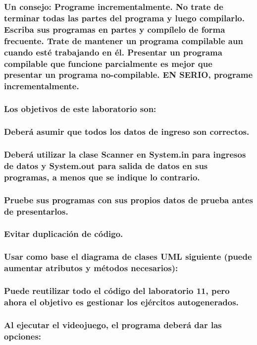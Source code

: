 \documentclass{article}
\begin{document}
\begin{itemize}
\begin{itemize}
        \subsubsection {Un consejo: Programe incrementalmente. No trate de terminar todas las partes del programa y luego compilarlo. Escriba sus programas en partes y compílelo de forma frecuente. Trate de mantener un programa compilable aun cuando esté trabajando en él. Presentar un programa compilable que funcione parcialmente es mejor que presentar un programa no-compilable.  EN SERIO, programe incrementalmente.}
        \subsubsection {Los objetivos de este laboratorio son:}
        \subsubsection {Deberá asumir que todos los datos de ingreso son correctos.}
        \subsubsection {Deberá utilizar la clase Scanner en System.in para ingresos de datos y System.out para salida de datos en sus programas, a menos que se indique lo contrario.}
        \subsubsection {Pruebe sus programas con sus propios datos de prueba antes de presentarlos.} 
        \subsubsection {Evitar duplicación de código.}
        \subsubsection {Usar como base el diagrama de clases UML siguiente (puede aumentar atributos y métodos necesarios):}
        \subsubsection {Puede reutilizar todo el código del laboratorio 11, pero ahora el objetivo es gestionar los ejércitos autogenerados.}
        \subsubsection {Al ejecutar el videojuego, el programa deberá dar las opciones:}

\end{itemize}
\end{itemize}
\end{document}
